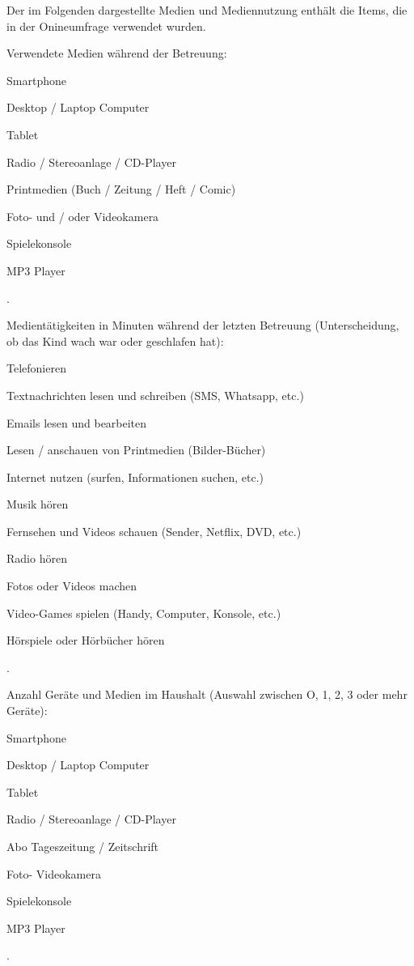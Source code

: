 Der im Folgenden dargestellte Medien und Mediennutzung enthält die Items, die in der Onineumfrage verwendet wurden. 

Verwendete Medien während der Betreuung: \begin{seriate}
  \item Smartphone
  \item Desktop / Laptop Computer
  \item Tablet
  \item Radio / Stereoanlage / CD-Player
  \item Printmedien (Buch / Zeitung / Heft / Comic)
  \item Foto- und / oder Videokamera
  \item Spielekonsole
  \item MP3 Player
\end{seriate}.

Medientätigkeiten in Minuten während der letzten Betreuung (Unterscheidung, ob das Kind wach war oder geschlafen hat):
\begin{seriate}
  \item Telefonieren
  \item Textnachrichten lesen und schreiben (SMS, Whatsapp, etc.)
  \item Emails lesen und bearbeiten
  \item Lesen / anschauen von Printmedien (Bilder-Bücher)
  \item Internet nutzen (surfen, Informationen suchen, etc.)
  \item Musik hören
  \item Fernsehen und Videos schauen (Sender, Netflix, DVD, etc.)
  \item Radio hören
  \item Fotos oder Videos machen
  \item Video-Games spielen (Handy, Computer, Konsole, etc.)
  \item Hörspiele oder Hörbücher hören
\end{seriate}.

Anzahl Geräte und Medien im Haushalt (Auswahl zwischen O, 1, 2, 3 oder mehr Geräte):
\begin{seriate}
  \item Smartphone
  \item Desktop / Laptop Computer
  \item Tablet
  \item Radio / Stereoanlage / CD-Player
  \item Abo Tageszeitung / Zeitschrift
  \item Foto- Videokamera
  \item Spielekonsole
  \item MP3 Player
\end{seriate}.


